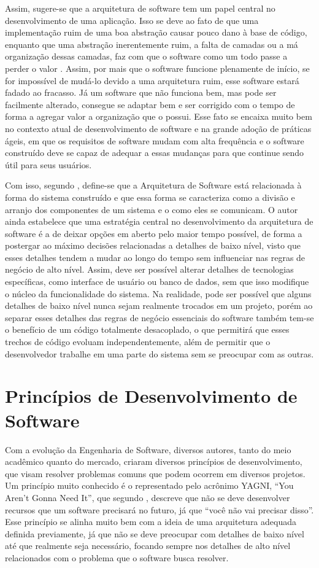 \documentclass[12pt, %
openright, 
oneside, %
a4paper,    %
brazil]{facom-ufu-abntex2}
\begin{document}
Assim, sugere-se que a arquitetura de software tem um papel central no desenvolvimento de uma aplicação. Isso se deve ao fato de que uma implementação ruim de uma boa abstração causar pouco dano à base de código, enquanto que uma abstração inerentemente ruim, a falta de camadas ou a má organização dessas camadas, faz com que o software como um todo passe a perder o valor \cite{KIEHL}. Assim, por mais que o software funcione plenamente de início, se for impossível de mudá-lo devido a uma arquitetura ruim, esse software estará fadado ao fracasso. Já um software que não funciona bem, mas pode ser facilmente alterado, consegue se adaptar bem e ser corrigido com o tempo de forma a agregar valor a organização que o possui. Esse fato se encaixa muito bem no contexto atual de desenvolvimento de software e na grande adoção de práticas ágeis, em que os requisitos de software mudam com alta frequência e o software construído deve se capaz de adequar a essas mudanças para que continue sendo útil para seus usuários.

Com isso, segundo , define-se que a Arquitetura de Software está relacionada à forma do sistema construído e que essa forma se caracteriza como a divisão e arranjo dos componentes de um sistema e o como eles se comunicam. O autor ainda estabelece que uma estratégia central no desenvolvimento da arquitetura de software é a de deixar opções em aberto pelo maior tempo possível, de forma a postergar ao máximo decisões relacionadas a detalhes de baixo nível, visto que esses detalhes tendem a mudar ao longo do tempo sem influenciar nas regras de negócio de alto nível. Assim, deve ser possível alterar detalhes de tecnologias específicas, como interface de usuário ou banco de dados, sem que isso modifique o núcleo da funcionalidade do sistema. Na realidade, pode ser possível que alguns detalhes de baixo nível nunca sejam realmente trocados em um projeto, porém ao separar esses detalhes das regras de negócio essenciais do software também tem-se o benefício de um código totalmente desacoplado, o que permitirá que esses trechos de código evoluam independentemente, além de permitir que o desenvolvedor trabalhe em uma parte do sistema sem se preocupar com as outras.

\section{Princípios de Desenvolvimento de Software}
Com a evolução da Engenharia de Software, diversos autores, tanto do meio acadêmico quanto do mercado, criaram diversos princípios de desenvolvimento, que visam resolver problemas comuns que podem ocorrem em diversos projetos. Um princípio muito conhecido é o representado pelo acrônimo YAGNI, ``You Aren't Gonna Need It'', que segundo , descreve que não se deve desenvolver recursos que um software precisará no futuro, já que ``você não vai precisar disso''. Esse princípio se alinha muito bem com a ideia de uma arquitetura adequada definida previamente, já que não se deve preocupar com detalhes de baixo nível até que realmente seja necessário, focando sempre nos detalhes de alto nível relacionados com o problema que o software busca resolver.
\end{document}
